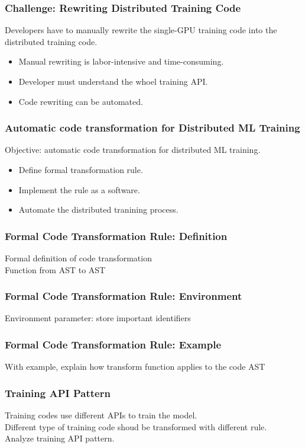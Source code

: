 \documentclass{beamer}
\begin{document}
\begin{frame}
  \frametitle{Challenge: Rewriting Distributed Training Code}
  Developers have to manually rewrite the single-GPU training code
  into the distributed training code.
  \begin{itemize}
    \item Manual rewriting is labor-intensive and time-consuming.
    \item Developer must understand the whoel training API.
    \item Code rewriting can be automated.
  \end{itemize}
\end{frame}


\begin{frame}
  \frametitle{Automatic code transformation for Distributed ML Training}
  Objective: automatic code transformation for distributed ML training.
  \begin{itemize}
    \item Define formal transformation rule.
    \item Implement the rule as a software.
    \item Automate the distributed tranining process.
  \end{itemize}
\end{frame}


\begin{frame}
  \frametitle{Formal Code Transformation Rule: Definition}
  Formal definition of code transformation\\
  Function from AST to AST  
\end{frame}


\begin{frame}
  \frametitle{Formal Code Transformation Rule: Environment}
  Environment parameter: store important identifiers
\end{frame}


\begin{frame}
  \frametitle{Formal Code Transformation Rule: Example}
  With example, explain how transform function applies to the code AST
\end{frame}


\begin{frame}
  \frametitle{Training API Pattern}
  Training codes use different APIs to train the model.\\
  Different type of training code shoud be transformed with different rule.\\
  Analyze training API pattern.
\end{frame}
\end{document}
